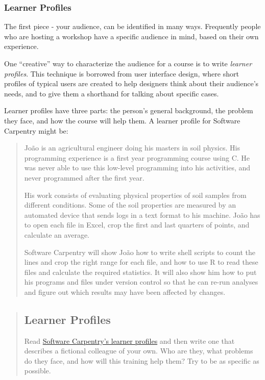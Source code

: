 \subsubsection*{Learner Profiles}

The first piece - your audience, can be identified in many ways.  Frequently 
people who are hosting a workshop have a specific audience in mind, 
based on their own experience.

One ``creative'' way to characterize the audience for a course is to write \emph{learner profiles}.
This technique is borrowed from user interface design,
where short profiles of typical users are created
to help designers think about their audience's needs,
and to give them a shorthand for talking about specific cases.

Learner profiles have three parts:
the person's general background,
the problem they face,
and how the course will help them.
A learner profile for Software Carpentry might be:

\begin{quotation}   %
João is an agricultural engineer doing his masters in soil physics.
His programming experience is a first year programming course using C.
He was never able to use this low-level programming into his activities,
and never programmed after the first year.

His work consists of evaluating physical properties of soil samples from different conditions.
Some of the soil properties are measured by an automated device that sends logs in a text format to his machine.
João has to open each file in Excel,
crop the first and last quarters of points,
and calculate an average.

Software Carpentry will show João how to write shell scripts to count the lines and crop the right range for each file,
and how to use R to read these files and calculate the required statistics.
It will also show him how to put his programs and files under version control
so that he can re-run analyses and figure out which results may have been affected by changes.
\end{quotation}   %

\begin{quotation}   %
\subsection*{Learner Profiles}

Read \href{\{\{ site.swc\_site \}\}/audience/}{Software Carpentry's learner profiles}
and then write one that describes a fictional colleague of your own.
Who are they,
what problems do they face,
and how will this training help them?
Try to be as specific as possible.
\end{quotation}   %


